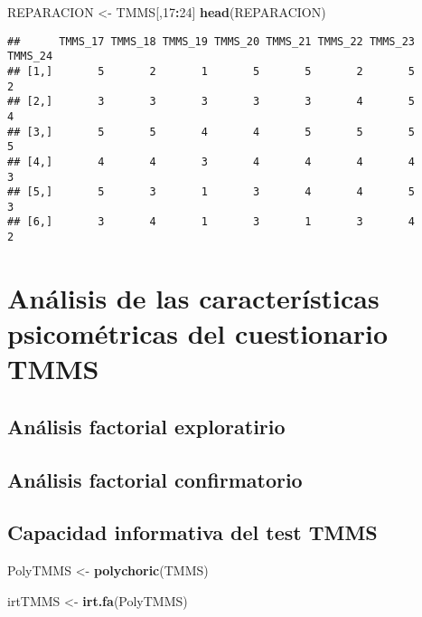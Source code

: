\documentclass[
  10pt,
  spanish,
]{article}
\newenvironment{Shaded}{\begin{snugshade}}{\end{snugshade}}
\newcommand{\DecValTok}[1]{\textcolor[rgb]{0.00,0.00,0.81}{#1}}
\newcommand{\KeywordTok}[1]{\textcolor[rgb]{0.13,0.29,0.53}{\textbf{#1}}}
\newcommand{\NormalTok}[1]{#1}
\newcommand{\OperatorTok}[1]{\textcolor[rgb]{0.81,0.36,0.00}{\textbf{#1}}}
\newcommand{\StringTok}[1]{\textcolor[rgb]{0.31,0.60,0.02}{#1}}
\begin{document}
\begin{Shaded}
\begin{Highlighting}[]
\NormalTok{REPARACION <-}\StringTok{ }\NormalTok{TMMS[,}\DecValTok{17}\OperatorTok{:}\DecValTok{24}\NormalTok{]}
\KeywordTok{head}\NormalTok{(REPARACION)}
\end{Highlighting}
\end{Shaded}

\begin{verbatim}
##      TMMS_17 TMMS_18 TMMS_19 TMMS_20 TMMS_21 TMMS_22 TMMS_23 TMMS_24
## [1,]       5       2       1       5       5       2       5       2
## [2,]       3       3       3       3       3       4       5       4
## [3,]       5       5       4       4       5       5       5       5
## [4,]       4       4       3       4       4       4       4       3
## [5,]       5       3       1       3       4       4       5       3
## [6,]       3       4       1       3       1       3       4       2
\end{verbatim}

\hypertarget{anuxe1lisis-de-las-caracteruxedsticas-psicomuxe9tricas-del-cuestionario-tmms}{%
\section{Análisis de las características psicométricas del cuestionario
TMMS}\label{anuxe1lisis-de-las-caracteruxedsticas-psicomuxe9tricas-del-cuestionario-tmms}}

\hypertarget{anuxe1lisis-factorial-exploratirio}{%
\subsection{Análisis factorial
exploratirio}\label{anuxe1lisis-factorial-exploratirio}}

\hypertarget{anuxe1lisis-factorial-confirmatorio}{%
\subsection{Análisis factorial
confirmatorio}\label{anuxe1lisis-factorial-confirmatorio}}

\hypertarget{capacidad-informativa-del-test-tmms}{%
\subsection{Capacidad informativa del test
TMMS}\label{capacidad-informativa-del-test-tmms}}

\begin{Shaded}
\begin{Highlighting}[]
\NormalTok{PolyTMMS <-}\StringTok{ }\KeywordTok{polychoric}\NormalTok{(TMMS)}

\NormalTok{irtTMMS <-}\StringTok{ }\KeywordTok{irt.fa}\NormalTok{(PolyTMMS)}
\end{Highlighting}
\end{Shaded}
\end{document}

